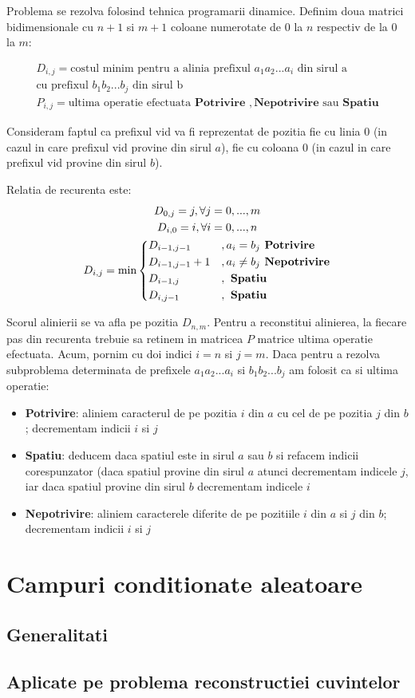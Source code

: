 Problema se rezolva folosind tehnica programarii dinamice. Definim
doua matrici bidimensionale cu $n+1$ si $m+1$ coloane numerotate de $0$ la $n$ respectiv de la $0$
la $m$:

\begin{gather*}
  D_{i,j} = \text{costul minim pentru a alinia prefixul } a_1a_2...a_i \text{ din sirul a} \\
  \text{cu prefixul } b_1b_2...b_j \text{ din sirul b} \\
  P_{i,j} = \text{ultima operatie efectuata } \textbf{Potrivire }, \textbf{Nepotrivire } \text{sau} 
  \textbf{ Spatiu}
\end{gather*}

Consideram faptul ca prefixul vid va fi reprezentat de pozitia fie cu linia $0$ (in cazul in care
prefixul vid provine din sirul $a$), fie cu coloana $0$ (in cazul in care prefixul vid provine
din sirul $b$).

Relatia de recurenta este:
\begin{gather*}
  D_{0,j} = j, \forall j=0,...,m \\
  D_{i,0} = i, \forall i=0,...,n \\
  D_{i,j} = \min \begin{dcases}
      D_{i-1,j-1}       &, a_i=b_j \textbf{ Potrivire} \\
      D_{i-1,j-1}+1     &, a_i \neq b_j \textbf{ Nepotrivire} \\
      D_{i-1,j}         &, \textbf{ Spatiu} \\
      D_{i,j-1}         &, \textbf{ Spatiu} \\
    \end{dcases}
\end{gather*}

Scorul alinierii se va afla pe pozitia $D_{n,m}$. Pentru a reconstitui alinierea, la fiecare pas din 
recurenta trebuie sa retinem in matricea $P$ matrice ultima operatie efectuata. Acum, pornim cu doi
indici $i = n$ si $j = m$. Daca pentru a rezolva subproblema determinata de prefixele $a_1a_2...a_i$
si $b_1b_2...b_j$ am folosit ca si ultima operatie:

\begin{itemize}
  \item \textbf{Potrivire}: aliniem caracterul de pe pozitia $i$ din $a$ cu cel de pe pozitia $j$ 
    din $b$; decrementam indicii $i$ si $j$  
  \item \textbf{Spatiu}: deducem daca spatiul este in sirul $a$ sau $b$ si refacem indicii corespunzator
    (daca spatiul provine din sirul $a$ atunci decrementam indicele $j$, iar daca spatiul provine
    din sirul $b$ decrementam indicele $i$
  \item \textbf{Nepotrivire}: aliniem caracterele diferite de pe pozitiile $i$ din $a$ si $j$ din $b$;
    decrementam indicii $i$ si $j$
\end{itemize}

    
\section{Campuri conditionate aleatoare}
\subsection{Generalitati}
\subsection{Aplicate pe problema reconstructiei cuvintelor}

